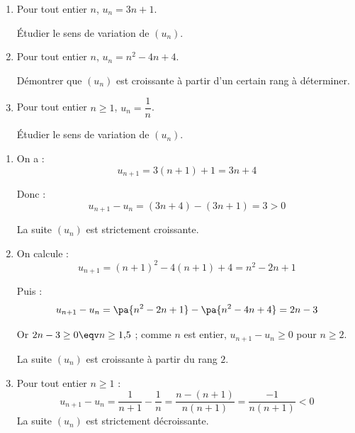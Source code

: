 \begin{methode}
	\nline
	\begin{enumerate}
		\item Pour tout entier $n$, $u_n = 3n + 1$.

		      Étudier le sens de variation de $(u_n)$.
		\item Pour tout entier $n$, $u_n = n^2 - 4n + 4$.

		      Démontrer que $(u_n)$ est croissante à partir d'un certain rang à déterminer.
		\item Pour tout entier $n \geq 1$, $u_n = \dfrac{1}{n}$.

		      Étudier le sens de variation de $(u_n)$.
	\end{enumerate}

	\begin{correction}
		\nline
		\begin{enumerate}
			\item On a :
			      \[
				      u_{n+1} = 3(n + 1) + 1 = 3n + 4
			      \]

			      Donc :
			      \[
				      u_{n+1} - u_n = (3n + 4) - (3n + 1) = 3 > 0
			      \]

			      La suite $(u_n)$ est strictement croissante.
			\item On calcule :
			      \[
				      u_{n+1} = (n + 1)^2 - 4(n + 1) + 4 = n^2 - 2n + 1
			      \]

			      Puis :
			      \[
				      u_{n+1} - u_n = \pa{n^2 - 2n + 1} - \pa{n^2 - 4n + 4} = 2n - 3
			      \]

			      Or $2n - 3 \geq 0 \eqv n \geq 1{,}5$ ; comme $n$ est entier, $u_{n+1} - u_n \geq 0$ pour $n \geq 2$.

			      La suite $(u_n)$ est croissante à partir du rang $2$.
			\item Pour tout entier $n \geq 1$ :
			      \[
				      u_{n+1} - u_n = \dfrac{1}{n + 1} - \dfrac{1}{n} = \dfrac{n - (n + 1)}{n(n + 1)} = \dfrac{-1}{n(n + 1)} < 0
			      \]
			      La suite $(u_n)$ est strictement décroissante.
		\end{enumerate}
	\end{correction}
\end{methode}

